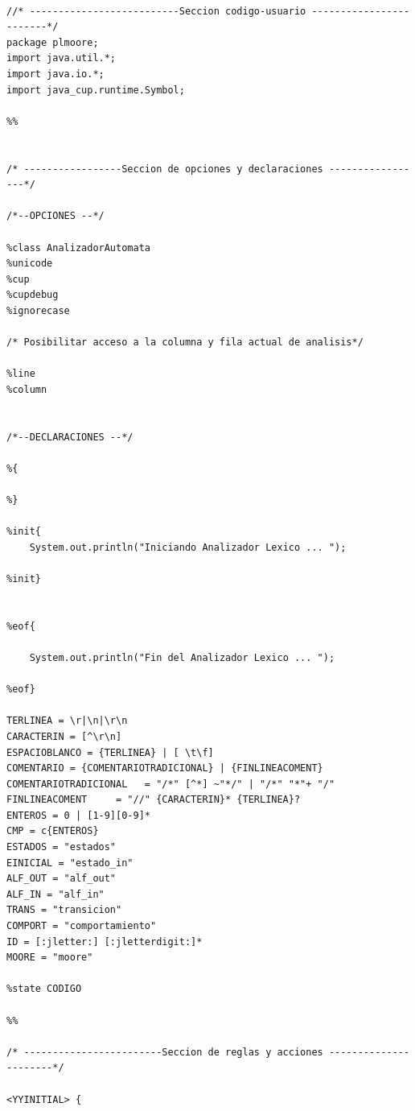 \documentclass[12pt,a4paper]{article}
\begin{document}
\begin{lstlisting}[caption=Analizador Léxico en JFlex]

//* --------------------------Seccion codigo-usuario ------------------------*/
package plmoore;
import java.util.*;
import java.io.*;
import java_cup.runtime.Symbol;

%%


/* -----------------Seccion de opciones y declaraciones -----------------*/

/*--OPCIONES --*/

%class AnalizadorAutomata
%unicode
%cup
%cupdebug
%ignorecase

/* Posibilitar acceso a la columna y fila actual de analisis*/

%line
%column


/*--DECLARACIONES --*/

%{

%}

%init{
	System.out.println("Iniciando Analizador Lexico ... ");

%init}


%eof{

	System.out.println("Fin del Analizador Lexico ... ");

%eof}

TERLINEA = \r|\n|\r\n
CARACTERIN = [^\r\n]
ESPACIOBLANCO = {TERLINEA} | [ \t\f]
COMENTARIO = {COMENTARIOTRADICIONAL} | {FINLINEACOMENT}
COMENTARIOTRADICIONAL   = "/*" [^*] ~"*/" | "/*" "*"+ "/"
FINLINEACOMENT     = "//" {CARACTERIN}* {TERLINEA}?
ENTEROS = 0 | [1-9][0-9]*
CMP = c{ENTEROS}
ESTADOS = "estados"
EINICIAL = "estado_in"
ALF_OUT = "alf_out"
ALF_IN = "alf_in"
TRANS = "transicion"
COMPORT = "comportamiento"
ID = [:jletter:] [:jletterdigit:]*
MOORE = "moore"

%state CODIGO

%%

/* ------------------------Seccion de reglas y acciones ----------------------*/

<YYINITIAL> {


\end{lstlisting}
\end{document}
